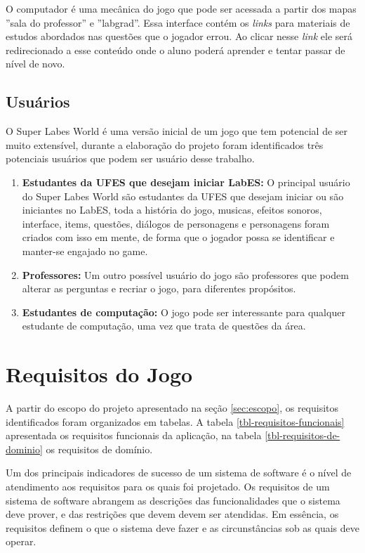 O computador é uma mecânica do jogo que pode ser acessada a partir dos mapas ''sala do professor'' e ''labgrad''.  Essa interface contém os \textit{links} para materiais de estudos abordados nas questões que o jogador errou. Ao clicar nesse \textit{link} ele será redirecionado a esse conteúdo onde o aluno poderá aprender e tentar passar de nível de novo.
\subsection{Usuários}
\label{sec:usuarios}
O Super Labes World é uma versão inicial de um jogo que tem potencial de ser muito extensível, durante a elaboração do projeto foram identificados três potenciais usuários que podem ser usuário desse trabalho.

\begin{enumerate}
    \item \textbf{Estudantes da UFES que desejam iniciar LabES:} O principal usuário do Super Labes World são estudantes da UFES que desejam iniciar ou são iniciantes no LabES, toda a história do jogo, musicas, efeitos sonoros, interface, items, questões, diálogos de personagens e personagens foram criados com isso em mente, de forma que o jogador possa se identificar e manter-se engajado no game. 
    \item \textbf{Professores:} Um outro possível usuário do jogo são professores que podem alterar as perguntas e recriar o jogo, para diferentes propósitos. 
    \item \textbf{Estudantes de computação:} O jogo pode ser interessante para qualquer estudante de computação, uma vez que trata de questões da área.
\end{enumerate}

\section{Requisitos do Jogo}
\label{sec:requisitos-do-jogo}
A partir do escopo do projeto apresentado na seção \ref{sec:escopo}, os requisitos identificados foram organizados em tabelas. A tabela \ref{tbl-requisitos-funcionais} apresentada os requisitos funcionais da aplicação, na tabela \ref{tbl-requisitos-de-dominio} os requisitos de domínio.

Um dos principais indicadores de sucesso de um sistema de software é o nível de atendimento aos requisitos para os quais foi projetado. Os requisitos de um sistema de software abrangem as descrições das funcionalidades que o sistema deve prover, e das restrições que devem devem ser atendidas. Em essência, os requisitos definem o que o sistema deve fazer e as
circunstâncias sob as quais deve operar. \cite{sommervilleengenharia}

